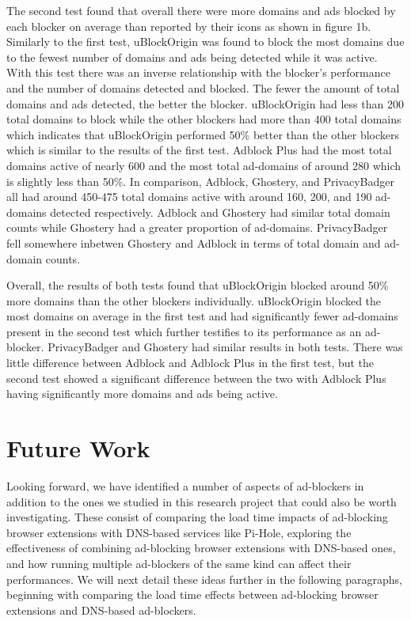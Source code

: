 \documentclass[sigsmall]{acmart}
\begin{document}
The second test found that overall there were more domains and ads blocked by each blocker on average than reported by their icons as shown in figure 1b. Similarly to the first test, uBlockOrigin was found to block the most domains due to the fewest number of domains and ads being detected while it was active. With this test there was an inverse relationship with the blocker's performance and the number of domains detected and blocked. The fewer the amount of total domains and ads detected, the better the blocker. uBlockOrigin had less than 200 total domains to block while the other blockers had more than 400 total domains which indicates that uBlockOrigin performed 50\% better than the other blockers which is similar to the results of the first test. Adblock Plus had the most total domains active of nearly 600 and the most total ad-domains of around 280 which is slightly less than 50\%. In comparison, Adblock, Ghostery, and PrivacyBadger all had around 450-475 total domains active with around 160, 200, and 190 ad-domains detected respectively. Adblock and Ghostery had similar total domain counts while Ghostery had a greater proportion of ad-domains. PrivacyBadger fell somewhere inbetwen Ghostery and Adblock in terms of total domain and ad-domain counts.   

Overall, the results of both tests found that uBlockOrigin blocked around 50\% more domains than the other blockers individually. uBlockOrigin blocked the most domains on average in the first test and had significantly fewer ad-domains present in the second test which further testifies to its performance as an ad-blocker. PrivacyBadger and Ghostery had similar results in both tests. There was little difference between Adblock and Adblock Plus in the first test, but the second test showed a significant difference between the two with Adblock Plus having significantly more domains and ads being active. 

\section*{Future Work}
 Looking forward, we have identified a number of aspects of ad-blockers in addition to the ones we studied in this research project that could also be worth investigating. These consist of comparing the load time impacts of ad-blocking browser extensions with DNS-based services like Pi-Hole, exploring the effectiveness of combining ad-blocking browser extensions with DNS-based ones, and how running multiple ad-blockers of the same kind can affect their performances. We will next detail these ideas further in the following paragraphs, beginning with comparing the load time effects between ad-blocking browser extensions and DNS-based ad-blockers.
\end{document}
